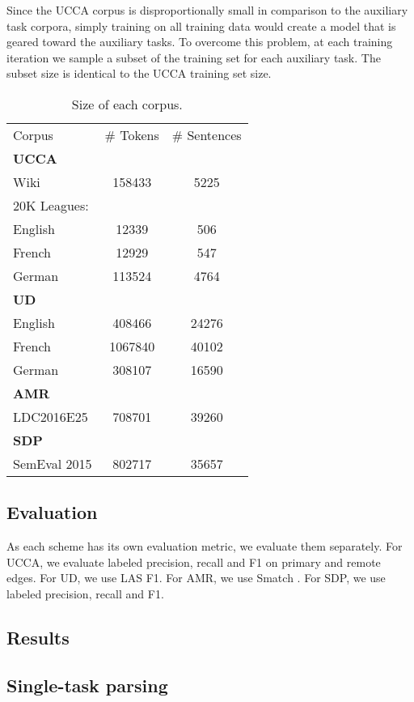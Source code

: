 \documentclass[11pt,a4paper]{article}
\begin{document}
Since the UCCA corpus is disproportionally small in comparison to the auxiliary task corpora,
simply training on all training data would create a model that is geared toward the auxiliary tasks.
To overcome this problem,
at each training iteration we sample a subset of the training set for each auxiliary task.
The subset size is identical to the UCCA training set size.

\begin{table}
\begin{tabular}{lcc}
Corpus & \# Tokens & \# Sentences \\
\textbf{UCCA} \\
Wiki & 158433 & 5225 \\
20K Leagues: \\
English & 12339 & 506 \\
French & 12929 & 547 \\
German & 113524 & 4764 \\
\textbf{UD} \\
English & 408466 & 24276 \\
French & 1067840 & 40102 \\
German & 308107 & 16590 \\
\textbf{AMR} \\
LDC2016E25 & 708701 & 39260 \\
\textbf{SDP} \\
SemEval 2015 & 802717 & 35657 \\
\end{tabular}
\caption{Size of each corpus.\label{tab:corpora}}
\end{table}


\subsection{Evaluation}\label{sec:evaluation}

As each scheme has its own evaluation metric, we evaluate them separately.
For UCCA, we evaluate labeled precision, recall and F1 on primary and remote edges.
For UD, we use LAS F1.
For AMR, we use Smatch \cite{cai2013smatch}.
For SDP, we use labeled precision, recall and F1.


\subsection{Results}\label{sec:results}




\subsection{Single-task parsing}\label{sec:results_single}
\end{document}

